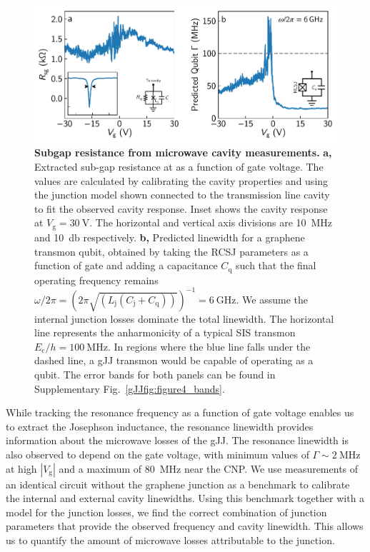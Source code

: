 \begin{figure}[thb]
	\centering
	\includegraphics[width=\linewidth]{chapter-gJJ/figs/fig4_final}
	\caption[]{\textbf{Subgap resistance from microwave cavity measurements.} 
		\textbf{a,}
		Extracted sub-gap resistance at as a function of gate voltage.
		The values are calculated by calibrating the cavity properties and using the junction model shown connected to the transmission line cavity to fit the observed cavity response.
		Inset shows the cavity response at $V_\text{g}=\SI{30}{\volt}$.
		The horizontal and vertical axis divisions are \SI{10}{\mega\hertz} and \SI{10}{\decibel} respectively.
		\textbf{b,}
		Predicted linewidth for a graphene transmon qubit, obtained by taking the RCSJ parameters as a function of gate and adding a capacitance $C_\text{q}$ such that the final operating frequency remains $\omega/2\pi = \left(2\pi\sqrt{(L_\text{j}(C_\text{j}+C_\text{q}))}\right)^{-1} = \SI{6}{\giga\hertz}$.
		We assume the internal junction losses dominate the total linewidth.
		The horizontal line represents the anharmonicity of a typical SIS transmon $E_\text{c}/h=\SI{100}{\mega\hertz}$.
		In regions where the blue line falls under the dashed line, a gJJ transmon would be capable of operating as a qubit.
		The error bands for both panels can be found in Supplementary Fig.~\ref{gJJfig:figure4_bands}.
	}
	\label{gJJfig:figure4}
\end{figure}

While tracking the resonance frequency as a function of gate voltage enables us to extract the Josephson inductance, the resonance linewidth provides information about the microwave losses of the gJJ.
The resonance linewidth is also observed to depend on the gate voltage, with minimum values of $\Gamma\sim\SI{2}{\mega\hertz}$ at high $|V_\text{g}|$ and a maximum of \SI{80}{\mega\hertz} near the CNP.
We use measurements of an identical circuit without the graphene junction as a benchmark to calibrate the internal and external cavity linewidths.
Using this benchmark together with a model for the junction losses, we find the correct combination of junction parameters that provide the observed frequency and cavity linewidth.
This allows us to quantify the amount of microwave losses attributable to the junction.

